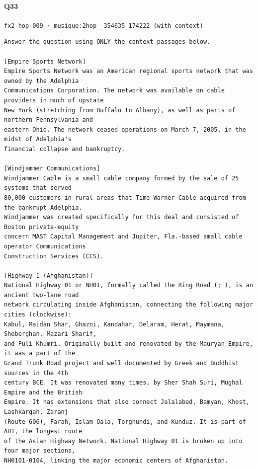 \documentclass[10pt]{article}
\begin{document}
\paragraph{Q33} \texttt{fx2-hop-009  ·  musique:2hop\_\_354635\_174222 (with context)}
\begin{verbatim}
Answer the question using ONLY the context passages below.

[Empire Sports Network]
Empire Sports Network was an American regional sports network that was owned by the Adelphia
Communications Corporation. The network was available on cable providers in much of upstate
New York (stretching from Buffalo to Albany), as well as parts of northern Pennsylvania and
eastern Ohio. The network ceased operations on March 7, 2005, in the midst of Adelphia's
financial collapse and bankruptcy.

[Windjammer Communications]
Windjammer Cable is a small cable company formed by the sale of 25 systems that served
80,000 customers in rural areas that Time Warner Cable acquired from the bankrupt Adelphia.
Windjammer was created specifically for this deal and consisted of Boston private-equity
concern MAST Capital Management and Jupiter, Fla.-based small cable operator Communications
Construction Services (CCS).

[Highway 1 (Afghanistan)]
National Highway 01 or NH01, formally called the Ring Road (; ), is an ancient two-lane road
network circulating inside Afghanistan, connecting the following major cities (clockwise):
Kabul, Maidan Shar, Ghazni, Kandahar, Delaram, Herat, Maymana, Sheberghan, Mazari Sharif,
and Puli Khumri. Originally built and renovated by the Mauryan Empire, it was a part of the
Grand Trunk Road project and well documented by Greek and Buddhist sources in the 4th
century BCE. It was renovated many times, by Sher Shah Suri, Mughal Empire and the British
Empire. It has extensions that also connect Jalalabad, Bamyan, Khost, Lashkargah, Zaranj
(Route 606), Farah, Islam Qala, Torghundi, and Kunduz. It is part of AH1, the longest route
of the Asian Highway Network. National Highway 01 is broken up into four major sections,
NH0101-0104, linking the major economic centers of Afghanistan.


\end{verbatim}
\end{document}
